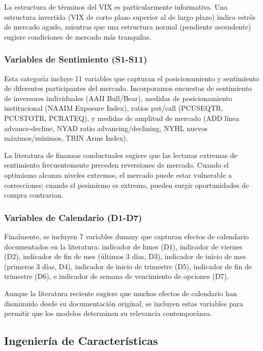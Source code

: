 \documentclass[11pt,a4paper]{article}
\begin{document}
La estructura de términos del VIX es particularmente informativa. Una estructura invertida (VIX de corto plazo superior al de largo plazo) indica estrés de mercado agudo, mientras que una estructura normal (pendiente ascendente) sugiere condiciones de mercado más tranquilas.

\subsubsection{Variables de Sentimiento (S1-S11)}

Esta categoría incluye 11 variables que capturan el posicionamiento y sentimiento de diferentes participantes del mercado. Incorporamos encuestas de sentimiento de inversores individuales (AAII Bull/Bear), medidas de posicionamiento institucional (NAAIM Exposure Index), ratios put/call (PCUSEQTR, PCUSTOTR, PCRATEQ), y medidas de amplitud de mercado (ADD línea advance-decline, NYAD ratio advancing/declining, NYHL nuevos máximos/mínimos, TRIN Arms Index).

La literatura de finanzas conductuales sugiere que las lecturas extremas de sentimiento frecuentemente preceden reversiones de mercado. Cuando el optimismo alcanza niveles extremos, el mercado puede estar vulnerable a correcciones; cuando el pesimismo es extremo, pueden surgir oportunidades de compra contrarian.

\subsubsection{Variables de Calendario (D1-D7)}

Finalmente, se incluyen 7 variables dummy que capturan efectos de calendario documentados en la literatura: indicador de lunes (D1), indicador de viernes (D2), indicador de fin de mes (últimos 3 días, D3), indicador de inicio de mes (primeros 3 días, D4), indicador de inicio de trimestre (D5), indicador de fin de trimestre (D6), e indicador de semana de vencimiento de opciones (D7).

Aunque la literatura reciente sugiere que muchos efectos de calendario han disminuido desde su documentación original, se incluyen estas variables para permitir que los modelos determinen su relevancia contemporánea.

\subsection{Ingeniería de Características}
\end{document}
